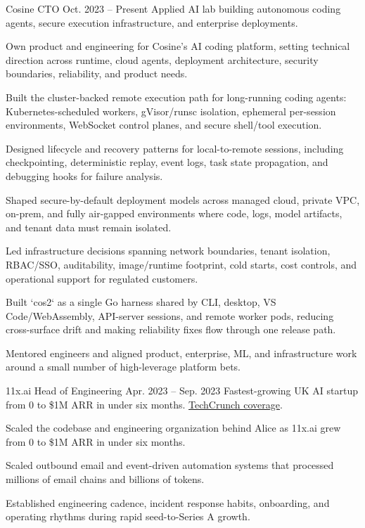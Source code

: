 
\ResumeJob
  {Cosine}
  {CTO}
  {Oct. 2023 -- Present}
  {Applied AI lab building autonomous coding agents, secure execution infrastructure, and enterprise deployments.}
\begin{ResumeList}
  \item Own product and engineering for Cosine's AI coding platform, setting technical direction across runtime, cloud agents, deployment architecture, security boundaries, reliability, and product needs.
  \item Built the cluster-backed remote execution path for long-running coding agents: Kubernetes-scheduled workers, gVisor/runsc isolation, ephemeral per-session environments, WebSocket control planes, and secure shell/tool execution.
  \item Designed lifecycle and recovery patterns for local-to-remote sessions, including checkpointing, deterministic replay, event logs, task state propagation, and debugging hooks for failure analysis.
  \item Shaped secure-by-default deployment models across managed cloud, private VPC, on-prem, and fully air-gapped environments where code, logs, model artifacts, and tenant data must remain isolated.
  \item Led infrastructure decisions spanning network boundaries, tenant isolation, RBAC/SSO, auditability, image/runtime footprint, cold starts, cost controls, and operational support for regulated customers.
  \item Built `cos2` as a single Go harness shared by CLI, desktop, VS Code/WebAssembly, API-server sessions, and remote worker pods, reducing cross-surface drift and making reliability fixes flow through one release path.
  \item Mentored engineers and aligned product, enterprise, ML, and infrastructure work around a small number of high-leverage platform bets.
\end{ResumeList}

\ResumeJob
  {11x.ai}
  {Head of Engineering}
  {Apr. 2023 -- Sep. 2023}
  {Fastest-growing UK AI startup from 0 to \$1M ARR in under six months. \href{https://techcrunch.com/2023/08/11/11xai-closes-2-million-pre-seed-to-create-autonomous-ai-workers/}{TechCrunch coverage}.}
\begin{ResumeList}
  \item Scaled the codebase and engineering organization behind Alice as 11x.ai grew from 0 to \$1M ARR in under six months.
  \item Scaled outbound email and event-driven automation systems that processed millions of email chains and billions of tokens.
  \item Established engineering cadence, incident response habits, onboarding, and operating rhythms during rapid seed-to-Series A growth.
\end{ResumeList}

